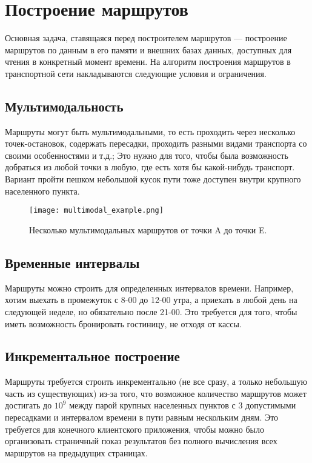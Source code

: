 \section{Построение маршрутов}
Основная задача, ставящаяся перед построителем маршрутов — построение маршрутов по данным в его памяти и внешних базах данных, доступных для чтения в конкретный момент времени. На алгоритм построения маршрутов в транспортной сети накладываются следующие условия и ограничения.

\subsection{Мультимодальность}
Маршруты могут быть мультимодальными, то есть проходить через несколько точек-остановок, содержать пересадки, проходить разными видами транспорта со своими особенностями и т.д.; Это нужно для того, чтобы была возможность добраться из любой точки в любую, где есть хотя бы какой-нибудь транспорт. Вариант пройти пешком небольшой кусок пути тоже доступен внутри крупного населенного пункта.
\begin{figure}[!h]
    \centering
    \texttt{[image: multimodal\_example.png]}
    \caption{Несколько мультимодальных маршрутов от точки A до точки E.}\label{fig1}
\end{figure}

\subsection{Временные интервалы}
Маршруты можно строить для определенных интервалов времени. Например, хотим выехать в промежуток с 8-00 до 12-00 утра, а приехать в любой день на следующей неделе, но обязательно после 21-00. Это требуется для того, чтобы иметь возможность бронировать гостиницу, не отходя от кассы.

\subsection{Инкрементальное построение}
Маршруты требуется строить инкрементально (не все сразу, а только небольшую часть из существующих) из-за того, что возможное количество маршрутов может достигать до $10^9$ между парой крупных населенных пунктов с 3 допустимыми пересадками и интервалом времени в пути равным нескольким дням. Это требуется для конечного клиентского приложения, чтобы можно было организовать страничный показ результатов без полного вычисления всех маршрутов на предыдущих страницах.

